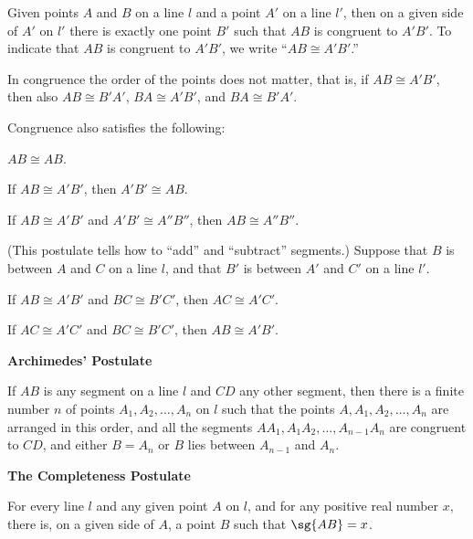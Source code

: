 \documentclass[11pt]{book}
\theoremstyle{bkplain}
\theoremstyle{XIplainnote}
\theoremstyle{bkplain}
\theoremstyle{bkplain}
\newcommand{\APPsub}[1]{%
  \par\medskip\begin{center}\bfseries\small #1\end{center}\par\nopagebreak}
\begin{document}
\begin{applist}[resume]
\item Given points $A$ and $B$ on a line $l$ and a point $A'$ on a line
      $l'$, then on a given side of $A'$ on $l'$ there is exactly one point
      $B'$ such that $AB$ is congruent to $A'B'$. To indicate that $AB$ is
      congruent to $A'B'$, we write ``$AB \cong A'B'$.''

      In congruence the order of the points does not matter, that is, if
      $AB \cong A'B'$, then also $AB \cong B'A'$, $BA \cong A'B'$, and
      $BA \cong B'A'$.
\item Congruence also satisfies the following:
      \begin{applist}
      \item $AB \cong AB$.
      \item If $AB \cong A'B'$, then $A'B' \cong AB$.
      \item If $AB \cong A'B'$ and $A'B' \cong A''B''$, then
            $AB \cong A''B''$.
      \end{applist}
\item (This postulate tells how to ``add'' and ``subtract'' segments.)
      Suppose that $B$ is between $A$ and $C$ on a line $l$, and that $B'$
      is between $A'$ and $C'$ on a line $l'$.
      \begin{applist}
      \item If $AB \cong A'B'$ and $BC \cong B'C'$, then $AC \cong A'C'$.
      \item If $AC \cong A'C'$ and $BC \cong B'C'$, then $AB \cong A'B'$.
      \end{applist}
\end{applist}

\APPsub{Archimedes' Postulate}

\begin{applist}[resume]
\item If $AB$ is any segment on a line $l$ and $CD$ any other segment, then
      there is a finite number $n$ of points $A_1, A_2, \ldots, A_n$ on $l$
      such that the points $A, A_1, A_2, \ldots, A_n$ are arranged in this
      order, and all the segments $AA_1, A_1A_2, \ldots, A_{n-1}A_n$ are
      congruent to $CD$, and either $B = A_n$ or $B$ lies between $A_{n-1}$
      and $A_n$.
\end{applist}

\APPsub{The Completeness Postulate}

\begin{applist}[resume]
\item For every line $l$ and any given point $A$ on $l$, and for any
      positive real number $x$, there is, on a given side of $A$, a point
      $B$ such that $\sg{AB} = x$.
\end{applist}
\end{document}
